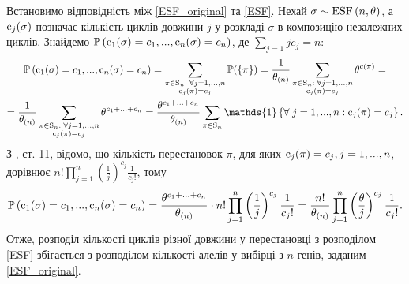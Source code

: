 Встановимо відповідність між \eqref{ESF_original} та \eqref{ESF}.
Нехай $\sigma \sim \mathrm{ESF}\left(n, \theta\right)$, а $\operatorname{c}_j(\sigma)$ позначає кількість
циклів довжини $j$ у розкладі $\sigma$ в композицію незалежних циклів.
Знайдемо $\mathbb{P}\left(\operatorname{c}_1(\sigma) = c_1,...,\operatorname{c}_n(\sigma) = c_n\right)$, 
де $\sum_{j=1}j c_j = n$:
\begin{gather*}
    \P{\cycle_1(\sigma) = c_1,...,\cycle_n(\sigma) = c_n} =
    \sum_{
        \substack{\pi \in \Sym{n} :\; \forall j = 1,...,n \\ \cycle_j(\pi) = c_j}
    } \mathbb{P}(\{\pi\}) = 
    \frac{1}{\theta_{(n)}} \sum_{
        \substack{\pi \in \Sym{n} :\; \forall j = 1,...,n \\ \cycle_j(\pi) = c_j}
    } \theta^{\cycle(\pi)} = \\ =
    \frac{1}{\theta_{(n)}} \sum_{
        \substack{\pi \in \Sym{n} :\; \forall j = 1,...,n \\ \cycle_j(\pi) = c_j}
    } \theta^{c_1 + ... + c_n} = 
    \frac{\theta^{c_1 + ... + c_n}}{\theta_{(n)}}
    \sum_{\pi \in \Sym{n}} \mathds{1}\left\{\forall \; j = 1,...,n : \cycle_j(\pi) = c_j\right\}.
\end{gather*}
З \cite{LogStructures}, ст. 11, відомо, що кількість
перестановок $\pi$, для яких $\operatorname{c}_j(\pi) = c_j, j = 1,...,n$,
дорівнює $n! \prod_{j=1}^n \left(\frac{1}{j}\right)^{c_j} \frac{1}{c_j!}$, 
тому
\begin{gather*}
    \mathbb{P}\left(\operatorname{c}_1(\sigma) = c_1,...,\operatorname{c}_n(\sigma) = c_n\right) =
    \frac{\theta^{c_1 + ... + c_n}}{\theta_{(n)}} \cdot n! \prod_{j=1}^n \left(\frac{1}{j}\right)^{c_j} \frac{1}{c_j!} =
    \frac{n!}{\theta_{(n)}} 
    \prod_{j=1}^n \left(\frac{\theta}{j}\right)^{c_j} \frac{1}{c_j!}.
\end{gather*}
Отже, розподіл кількості циклів різної довжини у перестановці з розподілом \eqref{ESF} збігається 
з розподілом кількості алелів у вибірці з $n$ генів, заданим \eqref{ESF_original}.